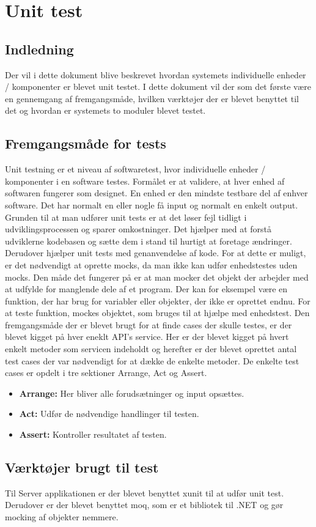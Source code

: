 \chapter{Unit test}

\section{Indledning}
Der vil i dette dokument blive beskrevet hvordan systemets individuelle enheder / komponenter er blevet unit testet. I dette dokument vil der som det første være en gennemgang af fremgangsmåde, hvilken værktøjer der er blevet benyttet til det og hvordan er systemets to moduler blevet testet. 

\section{Fremgangsmåde for tests}

Unit testning er et niveau af softwaretest, hvor individuelle enheder / komponenter i en software testes. Formålet er at validere, at hver enhed af softwaren fungerer som designet. En enhed er den mindste testbare del af enhver software. Det har normalt en eller nogle få input og normalt en enkelt output. Grunden til at man udfører unit tests er at det løser fejl tidligt i udviklingsprocessen og sparer omkostninger. Det hjælper med at forstå udviklerne kodebasen og sætte dem i stand til hurtigt at foretage ændringer. Derudover hjælper unit tests med genanvendelse af kode.
For at dette er muligt, er det nødvendigt at oprette mocks, da man ikke kan udfør enhedstestes uden mocks. Den måde det fungerer på er at man mocker det objekt der arbejder med at udfylde for manglende dele af et program. Der kan for eksempel være en funktion, der har brug for variabler eller objekter, der ikke er oprettet endnu. For at teste funktion, mockes objektet, som bruges til at hjælpe med enhedstest.
Den fremgangsmåde der er blevet brugt for at finde cases der skulle testes, er der blevet kigget på hver eneklt API’s service. Her er der blevet kigget på hvert enkelt metoder som servicen indeholdt og herefter er der blevet oprettet antal test cases der var nødvendigt for at dække de enkelte metoder. De enkelte test cases er opdelt i tre sektioner Arrange, Act og Assert. 
\begin{itemize}
    \item \textbf{Arrange:}  Her bliver alle forudsætninger og input opsættes.
    \item \textbf{Act:} Udfør de nødvendige handlinger til testen. 
    \item \textbf{Assert:} Kontroller resultatet af testen.
    
\end{itemize}


\section{Værktøjer brugt til test}

Til Server applikationen er der blevet benyttet xunit til at udfør unit test. Derudover er der blevet benyttet moq, som er et bibliotek til .NET og gør mocking af objekter nemmere. 